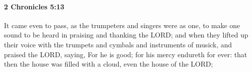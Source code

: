 
		\paragraph{2 Chronicles 5:13} %
			\label{2CHRONICLES-5-13}

			It came even to pass, as the trumpeters and singers were as one, to make one sound to be heard in praising and thanking the LORD; and when they lifted up their voice with the trumpets and cymbals and instruments of musick, and praised the LORD, saying, For he is good; for his mercy endureth for ever: that then the house was filled with a cloud, even the house of the LORD;


